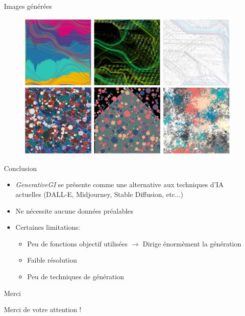 \documentclass[aspectratio=169]{beamer}
\begin{document}
\begin{frame}{Images générées}
    \begin{figure}
        \centering
        \includegraphics[scale=0.32]{fig/results2.png}
    \end{figure}
\end{frame}

\begin{frame}{Conclusion}
    \begin{itemize}
        \item \textit{GenerativeGI} se présente comme une alternative aux techniques d'IA actuelles (DALL-E, Midjourney, Stable Diffusion, etc...)
        \item Ne nécessite aucune données préalables
        \item Certaines limitations: 
        \begin{itemize}
            \item Peu de fonctions objectif utilisées $\rightarrow$ Dirige énormèment la génération
            \item Faible résolution 
            \item Peu de techniques de génération 
        \end{itemize}
    \end{itemize}
\end{frame}

\begin{frame}{Merci}
    \begin{center}
        Merci de votre attention !
    \end{center}
\end{frame}
    
\end{document}
